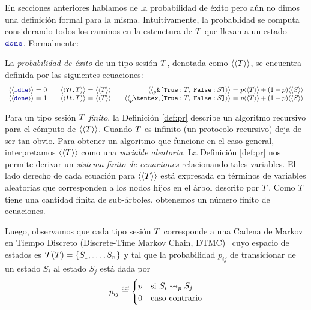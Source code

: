 En secciones anteriores hablamos de la probabilidad de éxito pero aún no dimos
una definición formal para la misma. Intuitivamente, la probablidad se computa
considerando todos los caminos en la estructura de $T$ que llevan a
un estado $\Done$. Formalmente:

\begin{definition}
  \label{def:pr}
	La \emph{probabilidad de éxito} de un tipo sesión $T$,
	denotada como $\langle\langle T\rangle\rangle$, se encuentra definida por
	las siguientes ecuaciones:
  \[
    \begin{array}{r@{~}c@{~}l}
      \psfun\Idle & = & 0 \\
      \psfun\Done & = & 1 \\
    \end{array}
    \quad
    \begin{array}{r@{~}c@{~}l}
      \psfun{\In\Type\SessionType} & = & \psfun\SessionType \\
      \psfun{\Out\Type\SessionType} & = & \psfun\SessionType \\
    \end{array}
    \quad
    \begin{array}{r@{~}c@{~}l}
      \psfun{\BinaryPBranch\SessionTypeT\SessionTypeS} & = & p\psfun\SessionTypeT + (1-p)\psfun\SessionTypeS \\
      \psfun{\BinaryPChoice\SessionTypeT\SessionTypeS} & = & p\psfun\SessionTypeT + (1-p)\psfun\SessionTypeS \\
    \end{array}
  \]
\end{definition}

Para un tipo sesión $T$ \emph{finito}, la Definición \ref{def:pr}
describe un algoritmo recursivo para el cómputo de $\langle\langle T\rangle\rangle$. Cuando
$T$ es infinito (un protocolo recursivo) deja de ser tan obvio. Para
obtener un algoritmo que funcione en el caso general, interpretamos
$\langle\langle T\rangle\rangle$ como una \emph{variable aleatoria}. La Definición
\ref{def:pr} nos permite derivar un \emph{sistema finito de ecuaciones}
relacionando tales variables. El lado derecho de cada ecuación para
$\langle\langle T\rangle\rangle$ está expresada en términos de variables aleatorias que
corresponden a los nodos hijos en el árbol descrito por $T$. Como
$T$ tiene una cantidad finita de sub-árboles, obtenemos un número
finito de ecuaciones.

Luego, observamos que cada tipo sesión $T$ corresponde a una Cadena
de Markov en Tiempo Discreto (Discrete-Time Markov Chain,
DTMC)~\cite{KemenySnell} cuyo espacio de estados es $\trees\SessionType =
\mathset{S_1, \dots, S_n}$ y tal que la probabilidad $p_{ij}$ de transicionar
de un estado $S_i$ al estado $S_j$ está dada por
\[
  p_{ij} \eqdef
  \begin{cases}
    p & \text{si $S_i \tred[p] S_j$}
    \\
    0 & \text{caso contrario}
  \end{cases}
\]
\label{pg:regreach}

